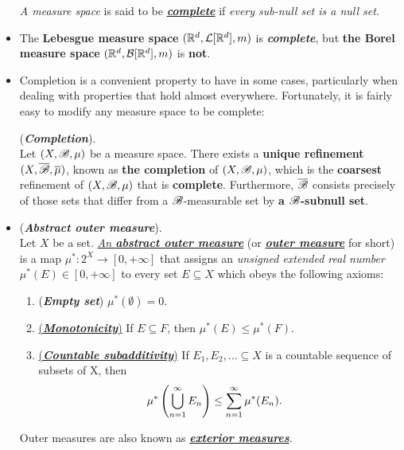\documentclass[11pt]{article}
\begin{document}
\begin{itemize}
\begin{definition}
\emph{A measure space} is said to be \underline{\emph{\textbf{complete}}} if \emph{every sub-null set is a null set}.
\end{definition}

\item \begin{theorem}
The \textbf{Lebesgue measure space} $({\mathbb R}^d, {\mathcal L}[{\mathbb R}^d], m)$ is \emph{\textbf{complete}}, but \textbf{the Borel measure space} $({\mathbb R}^d, {\mathcal B}[{\mathbb R}^d], m)$ is \textbf{not}.
\end{theorem}

\item Completion is a convenient property to have in some cases, particularly when dealing with properties that hold almost everywhere.
Fortunately, it is fairly easy to modify any measure space to be complete:

\begin{proposition} (\emph{\textbf{Completion}}).\\
 Let $(X, {\mathscr B}, \mu)$  be a measure space. There exists a \textbf{unique refinement} $(X, \overline{{\mathscr B}}, \overline{\mu})$, known as \textbf{the completion} of $(X, {\mathscr B}, \mu)$, which is the \textbf{coarsest} refinement of  $(X, {\mathscr B}, \mu)$ that is \textbf{complete}. Furthermore, $\overline{{\mathscr B}}$ consists precisely of those sets that differ from a ${\mathscr B}$-measurable set by \textbf{a ${\mathscr B}$-subnull set}.
\end{proposition}

\item \begin{definition} (\emph{\textbf{Abstract outer measure}}). \citep{tao2011introduction} \\
Let $X$ be a set. \underline{\emph{An \textbf{abstract outer measure}}} (or \underline{\emph{\textbf{outer measure}}} for short) is a map $\mu^{*}: 2^X \rightarrow [0, +\infty]$ that assigns an \emph{unsigned extended real number} $\mu^{*}(E) \in [0, +\infty]$ to every set $E \subseteq X$ which obeys the following axioms:
\begin{enumerate}
\item (\textbf{\emph{Empty set}}) $\mu^{*}(\emptyset) = 0$.
\item \underline{(\textbf{\emph{Monotonicity}})} If $E \subseteq F$,  then $\mu^{*}(E) \le  \mu^{*}(F)$.
\item  \underline{(\textbf{\emph{Countable subadditivity}})} If $E_1, E_2, \ldots \subseteq X$ is a countable sequence of subsets of X, then 
\begin{align*}
\mu^{*}\left(\bigcup_{n=1}^{\infty} E_n\right) &\le \sum_{n=1}^{\infty}\mu^{*}(E_n).
\end{align*}
\end{enumerate}
Outer measures are also known as \underline{\emph{\textbf{exterior measures}}}.
\end{definition}


\end{itemize}
\end{document}
